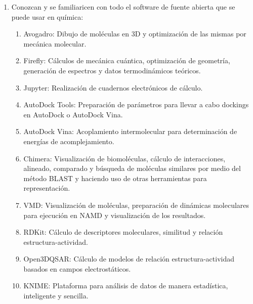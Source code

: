 \documentclass[10pt,letterpaper]{article}
\begin{document}
\begin{enumerate}
\item Conozcan y se familiaricen con todo el software de fuente abierta que se puede usar en qu\'imica:
	\begin{enumerate}
	\item Avogadro: Dibujo de mol\'eculas en 3D y optimizaci\'on de las mismas por mec\'anica molecular.
	\item Firefly: C\'alculos de mec\'anica cu\'antica, optimizaci\'on de geometr\'ia, generaci\'on de espectros y datos termodin\'amicos te\'oricos.
	\item Jupyter: Realizaci\'on de cuadernos electr\'onicos de c\'alculo.
	\item AutoDock Tools: Preparaci\'on de par\'ametros para llevar a cabo dockings en AutoDock o AutoDock Vina.
	\item AutoDock Vina: Acoplamiento intermolecular para determinaci\'on de energ\'ias de acomplejamiento.
	\item Chimera: Visualizaci\'on de biomol\'eculas, c\'alculo de interacciones, alineado, comparado y b\'usqueda de mol\'eculas similares por medio del m\'etodo BLAST y haciendo uso de otras herramientas para representaci\'on.
	\item VMD: Visualizaci\'on de mol\'eculas, preparaci\'on de din\'amicas moleculares para ejecuci\'on en NAMD y visualizaci\'on de los resultados.
	\item RDKit: C\'alculo de descriptores moleculares, similitud y relaci\'on estructura-actividad.
	\item Open3DQSAR: C\'alculo de modelos de relaci\'on estructura-actividad basados en campos electrost\'aticos.
	\item KNIME: Plataforma para an\'alisis de datos de manera estad\'istica, inteligente y sencilla.
	\end{enumerate}
\end{enumerate}
\end{document}
